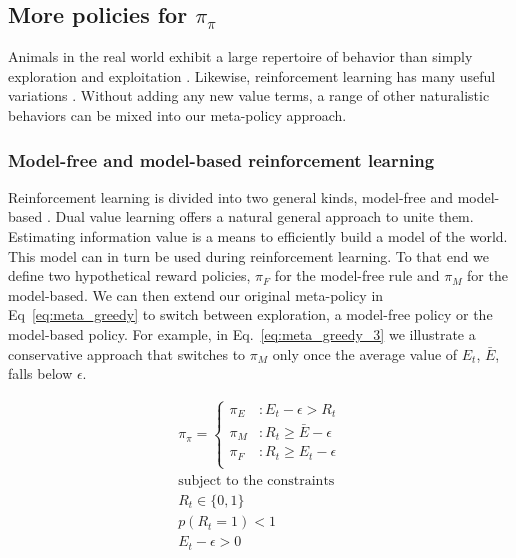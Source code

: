 \documentclass[9pt,twocolumn,twoside]{pnas-new}
\begin{document}
\subsection*{More policies for $\pi_{\pi}$}
Animals in the real world exhibit a large repertoire of behavior than simply exploration and exploitation \cite{TODO}. Likewise, reinforcement learning has many useful variations \cite{Sutton2018}. Without adding any new value terms, a range of other naturalistic behaviors can be mixed into our meta-policy approach. 

\subsubsection*{Model-free and model-based reinforcement learning}
Reinforcement learning is divided into two general kinds, model-free and model-based \cite{Sutton2018}. %
Dual value learning offers a natural general approach to unite them. Estimating information value is a means to efficiently build a model of the world. This model can in turn be used during reinforcement learning. To that end we define two hypothetical reward policies, $\pi_F$ for the model-free rule and $\pi_M$ for the model-based.  We can then extend our original meta-policy in Eq~\ref{eq:meta_greedy} to switch between exploration, a model-free policy or the model-based policy. For example, in Eq.~\ref{eq:meta_greedy_3} we illustrate a conservative approach that switches to $\pi_M$ only once the average value of $E_t$, $\bar E$, falls below $\epsilon$.

\begin{equation} \label{eq:meta_greedy_3}
    \begin{split}
        \pi_{\pi} = 
        \begin{cases}
            \pi_E & : E_t - \epsilon > R_t \\
            \pi_M & : R_t \geq \bar E - \epsilon \\
            \pi_F & : R_t \geq E_t - \epsilon \\
        \end{cases}\\
        \text{subject to the constraints}\\
        R_t \in \{0, 1\}\\ 
        p(R_t = 1) < 1\\
        E_t - \epsilon > 0
    \end{split}
\end{equation}
\end{document}
